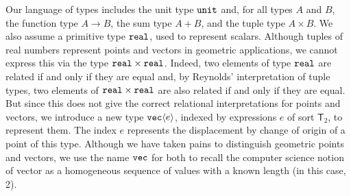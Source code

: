 \documentclass{sigplanconf}
\newcommand{\SynTransl}[1]{\mathsf{T}_#1}
\newcommand{\tyPrim}[2]{\textup{\texttt{#1}}\langle #2 \rangle}
\newcommand{\tyPrimNm}[1]{\textup{\texttt{#1}}}
\theoremstyle{examplestyle}
\theoremstyle{restatementstyle}
\begin{document}
Our language of types includes the unit type $\tyPrimNm{unit}$ and,
for all types $A$ and $B$, the function type $A \to B$, the sum type
$A + B$, and the tuple type $A \times B$. We also assume a primitive
type $\tyPrimNm{real}$, used to represent scalars. Although tuples of
real numbers represent points and vectors in geometric applications,
we cannot express this via the type
$\tyPrimNm{real} \times \tyPrimNm{real}$. Indeed,
two elements of type $\tyPrimNm{real}$ are related if and only if they
are equal and, by Reynolds' interpretation of tuple types, two
elements of $\tyPrimNm{real} \times \tyPrimNm{real}$ are also related
if and only if they are equal. But since this does not give the
correct relational interpretations for points and vectors, we
introduce a new type $\tyPrim{vec}{e}$, indexed by expressions $e$ of
sort $\SynTransl{2}$, to represent them.  The index $e$ represents the
displacement by change of origin of a point of this type.  Although we
have taken pains to distinguish geometric points and vectors, we use
the name $\tyPrimNm{vec}$ for both to recall the computer science
notion of vector as a homogeneous sequence of values with a known
length (in this case, 2).
\end{document}
